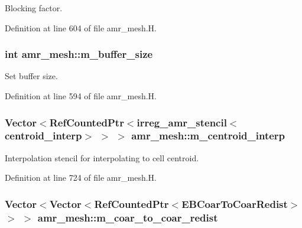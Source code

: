 Blocking factor. 



Definition at line 604 of file amr\+\_\+mesh.\+H.

\subsubsection[{\texorpdfstring{m\+\_\+buffer\+\_\+size}{m_buffer_size}}]{\setlength{\rightskip}{0pt plus 5cm}int amr\+\_\+mesh\+::m\+\_\+buffer\+\_\+size\hspace{0.3cm}{\ttfamily [protected]}}\hypertarget{classamr__mesh_aa2e19f25d2a5256a97c9d62d77afb923}{}\label{classamr__mesh_aa2e19f25d2a5256a97c9d62d77afb923}


Set buffer size. 



Definition at line 594 of file amr\+\_\+mesh.\+H.

\subsubsection[{\texorpdfstring{m\+\_\+centroid\+\_\+interp}{m_centroid_interp}}]{\setlength{\rightskip}{0pt plus 5cm}Vector$<$Ref\+Counted\+Ptr$<${\bf irreg\+\_\+amr\+\_\+stencil}$<${\bf centroid\+\_\+interp}$>$ $>$ $>$ amr\+\_\+mesh\+::m\+\_\+centroid\+\_\+interp\hspace{0.3cm}{\ttfamily [protected]}}\hypertarget{classamr__mesh_a24f677a3c567b7f4464a760a8c51ae92}{}\label{classamr__mesh_a24f677a3c567b7f4464a760a8c51ae92}


Interpolation stencil for interpolating to cell centroid. 



Definition at line 724 of file amr\+\_\+mesh.\+H.

\subsubsection[{\texorpdfstring{m\+\_\+coar\+\_\+to\+\_\+coar\+\_\+redist}{m_coar_to_coar_redist}}]{\setlength{\rightskip}{0pt plus 5cm}Vector$<$Vector$<$Ref\+Counted\+Ptr$<$E\+B\+Coar\+To\+Coar\+Redist$>$ $>$ $>$ amr\+\_\+mesh\+::m\+\_\+coar\+\_\+to\+\_\+coar\+\_\+redist\hspace{0.3cm}{\ttfamily [protected]}}\hypertarget{classamr__mesh_ae0949596c227cf6fd0259730997d6cf8}{}\label{classamr__mesh_ae0949596c227cf6fd0259730997d6cf8}


